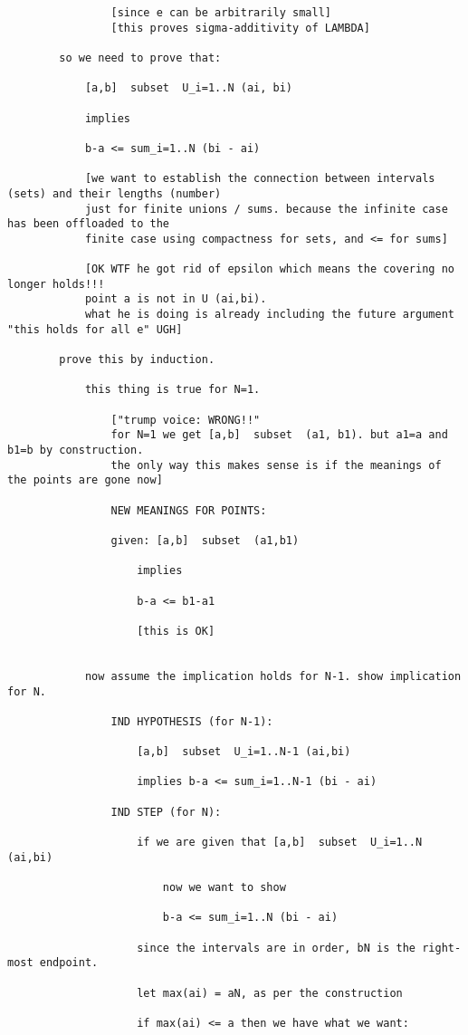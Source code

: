 \documentclass{article}
\begin{document}
\begin{flushleft}
\begin{verbatim}
				[since e can be arbitrarily small]
				[this proves sigma-additivity of LAMBDA]
				
		so we need to prove that:
		
			[a,b]  subset  U_i=1..N (ai, bi)
			
			implies
			
			b-a <= sum_i=1..N (bi - ai)
			
			[we want to establish the connection between intervals (sets) and their lengths (number)
			just for finite unions / sums. because the infinite case has been offloaded to the 
			finite case using compactness for sets, and <= for sums]
			
			[OK WTF he got rid of epsilon which means the covering no longer holds!!!
			point a is not in U (ai,bi).
			what he is doing is already including the future argument "this holds for all e" UGH]
			
		prove this by induction. 
		
			this thing is true for N=1.
				
				["trump voice: WRONG!!" 
				for N=1 we get [a,b]  subset  (a1, b1). but a1=a and b1=b by construction.
				the only way this makes sense is if the meanings of the points are gone now]
				
				NEW MEANINGS FOR POINTS:
				
				given: [a,b]  subset  (a1,b1)
				
					implies
					
					b-a <= b1-a1
					
					[this is OK]
			
			
			now assume the implication holds for N-1. show implication for N.
			
				IND HYPOTHESIS (for N-1):
				
					[a,b]  subset  U_i=1..N-1 (ai,bi)
			
					implies b-a <= sum_i=1..N-1 (bi - ai)
					
				IND STEP (for N):
				
					if we are given that [a,b]  subset  U_i=1..N (ai,bi)
						
						now we want to show 
						
						b-a <= sum_i=1..N (bi - ai)
						
					since the intervals are in order, bN is the right-most endpoint.
					
					let max(ai) = aN, as per the construction
					
					if max(ai) <= a then we have what we want:
					

\end{verbatim}
\end{flushleft}
\end{document}
